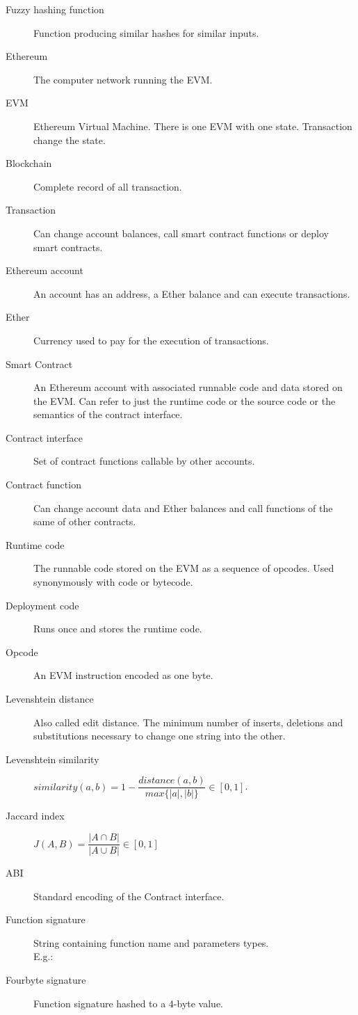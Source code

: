 \documentclass[../main.tex]{subfiles}
\begin{document}
\begin{description}
  \item[Fuzzy hashing function] Function producing similar hashes for similar inputs.
  \item[Ethereum] The computer network running the EVM.
  \item[EVM] Ethereum Virtual Machine. There is one EVM with one state. Transaction change the state.
  \item[Blockchain] Complete record of all transaction.
  \item[Transaction] Can change account balances, call smart contract functions or deploy smart contracts.
  \item[Ethereum account] An account has an address, a Ether balance and can execute transactions.
  \item[Ether] Currency used to pay for the execution of transactions.
  \item[Smart Contract] An Ethereum account with associated runnable code and data stored on the EVM. Can refer to just the runtime code or the source code or the semantics of the contract interface.
  \item[Contract interface] Set of contract functions callable by other accounts.
  \item[Contract function] Can change account data and Ether balances and call functions of the same of other contracts.
  \item[Runtime code] The runnable code stored on the EVM as a sequence of opcodes. Used synonymously with code or bytecode.
  \item[Deployment code] Runs once and stores the runtime code.
  \item[Opcode] An EVM instruction encoded as one byte.
  \item[Levenshtein distance] Also called edit distance. The minimum number of inserts, deletions and substitutions necessary to change one string into the other.
  \item[Levenshtein similarity] \( similarity(a, b) = 1 - \dfrac{distance(a, b)}{max\{|a|, |b|\}} \in [0,1] \).
  \item[Jaccard index] \(J(A,B) = \dfrac{|A \cap B|}{|A \cup B|} \in [0,1]\)
  \item[ABI] Standard encoding of the Contract interface.
  \item[Function signature] String containing function name and parameters types.\\E.g.: 
  \item[Fourbyte signature] Function signature hashed to a 4-byte value.
\end{description}
\end{document}
